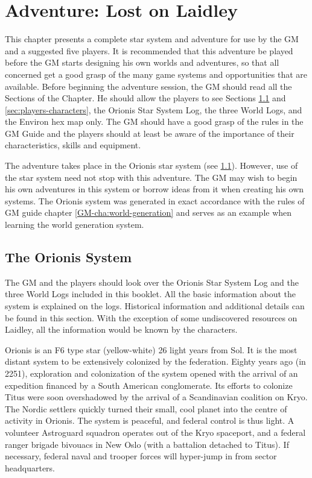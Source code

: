 \chapter{Adventure: Lost on Laidley}
\label{cha:advent-lost-laidl}

This chapter presents a complete star system and adventure for use by
the GM and a suggested five players. It is recommended that this
adventure be played before the GM starts designing his own worlds and
adventures, so that all concerned get a good grasp of the many game
systems and opportunities that are available. Before beginning the
adventure session, the GM should read all the Sections of the Chapter.
He should allow the players to see Sections \ref{sec:orionis-system}
and \ref{sec:players-characters}, the Orionis Star System Log, the
three World Logs, and the Environ hex map only.  The GM should have a
good grasp of the rules in the GM Guide and the players should at
least be aware of the importance of their characteristics, skills and
equipment.

The adventure takes place in the Orionis star system (see
\ref{sec:orionis-system}).  However, use of the star system need not
stop with this adventure.  The GM may wish to begin his own adventures
in this system or borrow ideas from it when creating his own systems.
The Orionis system was generated in exact accordance with the rules of
GM guide chapter \ref{GM-cha:world-generation} and serves as an
example when learning the world generation system.


\section{The Orionis System}
\label{sec:orionis-system}

The GM and the players should look over the Orionis Star System Log
and the three World Logs included in this booklet. All the basic
information about the system is explained on the logs. Historical
information and additional details can be found in this section. With
the exception of some undiscovered resources on Laidley, all the
information would be known by the characters.

Orionis is an F6 type star (yellow-white) 26 light years from Sol. It
is the most distant system to be extensively colonized by the
federation. Eighty years ago (in 2251), exploration and colonization
of the system opened with the arrival of an expedition financed by a
South American conglomerate. Its efforts to colonize Titus were soon
overshadowed by the arrival of a Scandinavian coalition on Kryo.  The
Nordic settlers quickly turned their small, cool planet into the
centre of activity in Orionis. The system is peaceful, and federal
control is thus light. A volunteer Astroguard squadron operates out of
the Kryo spaceport, and a federal ranger brigade bivouacs in New Oslo
(with a battalion detached to Titus). If necessary, federal naval and
trooper forces will hyper-jump in from sector headquarters.

